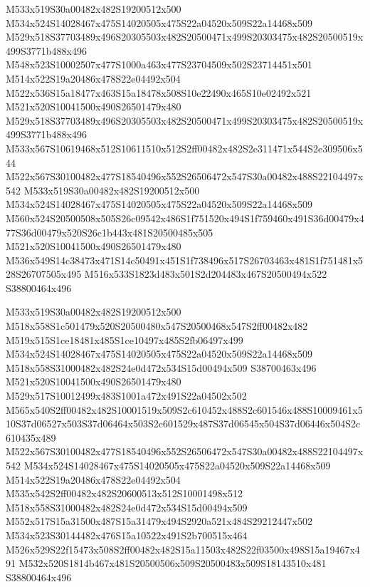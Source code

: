\documentclass{article}
\begin{document}
\begin{multicols}{2}
M533x519S30a00482x482S19200512x500 M534x524S14028467x475S14020505x475S22a04520x509S22a14468x509 M529x518S37703489x496S20305503x482S20500471x499S20303475x482S20500519x499S3771b488x496 M548x523S10002507x477S1000a463x477S23704509x502S23714451x501 M514x522S19a20486x478S22e04492x504 M522x536S15a18477x463S15a18478x508S10e22490x465S10e02492x521 M521x520S10041500x490S26501479x480 M529x518S37703489x496S20305503x482S20500471x499S20303475x482S20500519x499S3771b488x496 M533x567S10619468x512S10611510x512S2ff00482x482S2e311471x544S2e309506x544 M522x567S30100482x477S18540496x552S26506472x547S30a00482x488S22104497x542 M533x519S30a00482x482S19200512x500 M534x524S14028467x475S14020505x475S22a04520x509S22a14468x509 M560x524S20500508x505S26c09542x486S1f751520x494S1f759460x491S36d00479x477S36d00479x520S26c1b443x481S20500485x505 M521x520S10041500x490S26501479x480 M536x549S14c38473x471S14c50491x451S1f738496x517S26703463x481S1f751481x528S26707505x495 M516x533S1823d483x501S2d204483x467S20500494x522 S38800464x496

M533x519S30a00482x482S19200512x500 M518x558S1c501479x520S20500480x547S20500468x547S2ff00482x482 M519x515S1ce18481x485S1ce10497x485S2fb06497x499 M534x524S14028467x475S14020505x475S22a04520x509S22a14468x509 M518x558S31000482x482S24e0d472x534S15d00494x509 S38700463x496 M521x520S10041500x490S26501479x480 M529x517S10012499x483S1001a472x491S22a04502x502 M565x540S2ff00482x482S10001519x509S2c610452x488S2c601546x488S10009461x510S37d06527x503S37d06464x503S2c601529x487S37d06545x504S37d06446x504S2c610435x489 M522x567S30100482x477S18540496x552S26506472x547S30a00482x488S22104497x542 M534x524S14028467x475S14020505x475S22a04520x509S22a14468x509 M514x522S19a20486x478S22e04492x504 M535x542S2ff00482x482S20600513x512S10001498x512 M518x558S31000482x482S24e0d472x534S15d00494x509 M552x517S15a31500x487S15a31479x494S2920a521x484S29212447x502 M534x523S30144482x476S15a10522x491S2b700515x464 M526x529S22f15473x508S2ff00482x482S15a11503x482S22f03500x498S15a19467x491 M532x520S1814b467x481S20500506x509S20500483x509S18143510x481 S38800464x496


\end{multicols}
\end{document}

